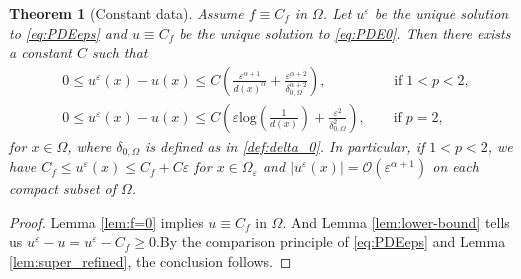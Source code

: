 \documentclass[12pt,reqno]{amsart}
\numberwithin{figure}{section}
\theoremstyle{plain}
\newtheorem{thm}{Theorem}[section]
\theoremstyle{remark}
\numberwithin{equation}{section}
\begin{document}
\begin{thm}[Constant data]\label{thm:rate_doubling0} Assume $f\equiv C_f$ in $\Omega$. Let $u^\varepsilon$ be the unique solution to \eqref{eq:PDEeps} and $u \equiv C_f$ be the unique solution to \eqref{eq:PDE0}. Then there exists a constant $C$ such that 
    \begin{equation*}
    \begin{split}
    &0\leq u^\varepsilon(x) - u(x)\leq C \left(\frac{ \varepsilon^{\alpha+1}}{d(x)^\alpha} + \frac{\varepsilon^{\alpha+2}}{\delta_{0,\Omega}^{\alpha+2}}\right),  \qquad\qquad \;\;\; \text{if}\; 1<p<2,\\
    &0\leq u^\varepsilon(x) - u(x)\leq C \left(\varepsilon \mathrm{log}\left(\frac{1}{d(x)}\right) + \frac{\varepsilon^{2}}{\delta_{0,\Omega}^{2}}\right),  \qquad \text{if}\; p=2,
    \end{split}
\end{equation*}
for $x\in \Omega$, where $\delta_{0,\Omega}$ is defined as in \eqref{def:delta_0}. In particular, if $1<p<2$, we have $C_f\leq u^\varepsilon(x)\leq C_f + C\varepsilon$ for $x\in \Omega_\varepsilon$ and $|u^\varepsilon(x)| = \mathcal{O}\left(\varepsilon^{\alpha+1}\right)$ on each compact subset of $\Omega$.
\end{thm}
\begin{proof} Lemma \ref{lem:f=0} implies $u \equiv C_f$ in $\Omega$. And Lemma \ref{lem:lower-bound} tells us $u^\varepsilon-u=u^\varepsilon-C_f \geq 0$.By the comparison principle of \eqref{eq:PDEeps} and Lemma \ref{lem:super_refined}, the conclusion follows.
\end{proof}
\end{document}
